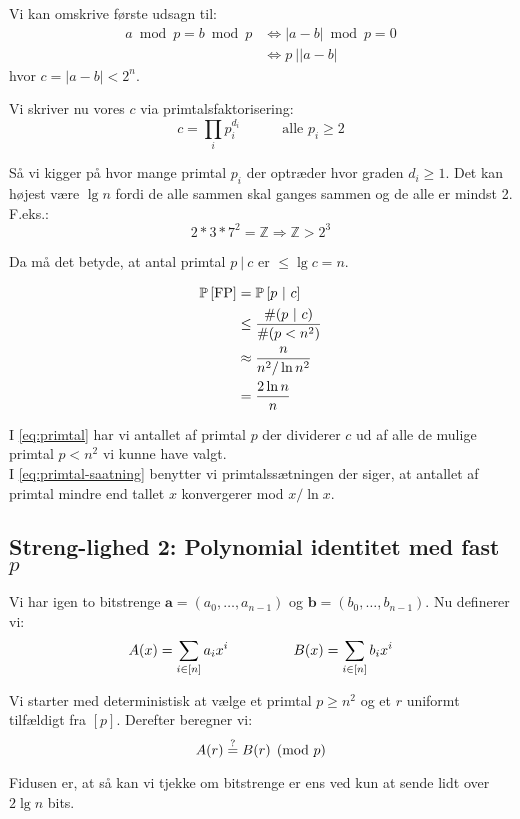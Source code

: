 Vi kan omskrive første udsagn til:
\begin{align}
  a \bmod p = b \bmod p
  &\Longleftrightarrow |a - b| \bmod p = 0\\
  &\Longleftrightarrow p \ \big| |a - b|
\end{align}
hvor $c = |a - b| < 2^n$.


Vi skriver nu vores $c$ via primtalsfaktorisering:
$$
  c = \prod_i p_i^{d_i} \quad\quad\quad \text{alle $p_i \geq 2$}
$$

Så vi kigger på hvor mange primtal $p_i$ der optræder hvor graden $d_i \geq 1$. Det kan højest være $\lg n$ fordi de alle sammen skal ganges sammen og de alle er mindst 2. F.eks.:
$$
  2 * 3 * 7^2 = \mathbb Z \Longrightarrow \mathbb Z > 2^3
$$

Da må det betyde, at antal primtal $p \ | \ c$ er $\leq \lg c = n$.

\begin{align}
  \P{\text{FP}}
  &= \P{ p \ | \ c} \nonumber \\
  &\leq \frac{\# (p \ | \ c)}{\# (p < n^2)} \label{eq:primtal} \\
  &\approx \frac{n}{n^2 / \ln n^2} \label{eq:primtal-saatning} \\
  &= \frac{2 \ln n}{n} \nonumber
\end{align}

I \cref{eq:primtal} har vi antallet af primtal $p$ der dividerer $c$ ud af alle de mulige primtal $p < n^2$  vi kunne have valgt.\\
I \cref{eq:primtal-saatning} benytter vi primtalssætningen der siger, at antallet af primtal mindre end tallet $x$ konvergerer mod $x / \ln x$.






\subsection{Streng-lighed 2: Polynomial identitet med fast $p$}
Vi har igen to bitstrenge $\mathbf a = (a_0, \dots, a_{n-1})$ og $\mathbf b = (b_0, \dots, b_{n-1})$. Nu definerer vi:
$$
  A(x) = \sum_{i \in [n]} a_i x^i
  \longspace
  B(x) = \sum_{i \in [n]} b_i x^i
$$

Vi starter med deterministisk at vælge et primtal $p \geq n^2$ og et $r$ uniformt tilfældigt fra $[p]$. Derefter beregner vi:
$$
  A(r) \? B(r) \pmod p
$$

Fidusen er, at så kan vi tjekke om bitstrenge er ens ved kun at sende lidt over $2 \lg n$ bits.\\

